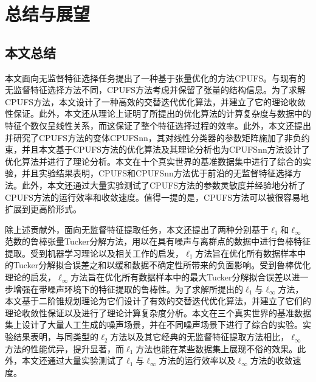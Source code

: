 \chapter{总结与展望}\label{chap:conc}

\section{本文总结}

本文面向无监督特征选择任务提出了一种基于张量优化的方法CPUFS。与现有的无监督特征选择方法不同，CPUFS方法考虑并保留了张量的结构信息。为了求解CPUFS方法，本文设计了一种高效的交替迭代优化算法，并建立了它的理论收敛性保证。此外，本文还从理论上证明了所提出的优化算法的计算复杂度与数据中的特征个数仅呈线性关系，而这保证了整个特征选择过程的效率。此外，本文还提出并研究了CPUFS方法的变体CPUFSnn，其对线性分类器的参数矩阵施加了非负约束，并且本文基于CPUFS方法的优化算法及其理论分析也为CPUFSnn方法设计了优化算法并进行了理论分析。本文在十个真实世界的基准数据集中进行了综合的实验，并且实验结果表明，CPUFS和CPUFSnn方法优于前沿的无监督特征选择方法。此外，本文还通过大量实验测试了CPUFS方法的参数灵敏度并经验地分析了CPUFS方法的运行效率和收敛速度。值得一提的是，CPUFS方法可以被很容易地扩展到更高阶形式。

除上述贡献外，面向无监督特征提取任务，本文还提出了两种分别基于$\ell_{1}$和$\ell_{\infty}$范数的鲁棒张量Tucker分解方法，用以在具有噪声与离群点的数据中进行鲁棒特征提取。受到机器学习理论以及相关工作的启发，$\ell_1$方法旨在优化所有数据样本中的Tucker分解拟合误差之和以缓和数据不确定性所带来的负面影响。受到鲁棒优化理论的启发，$\ell_\infty$方法旨在优化所有数据样本中的最大Tucker分解拟合误差以进一步增强在带噪声环境下的特征提取的鲁棒性。为了求解所提出的$\ell_1$与$\ell_\infty$方法，本文基于二阶锥规划理论为它们设计了有效的交替迭代优化算法，并建立了它们的理论收敛性保证以及进行了理论计算复杂度分析。本文在三个真实世界的基准数据集上设计了大量人工生成的噪声场景，并在不同噪声场景下进行了综合的实验。实验结果表明，与同类型的$\ell_2$方法以及其它经典的无监督特征提取方法相比，$\ell_\infty$方法的性能优异，提升显著，而$\ell_1$方法也能在某些数据集上展现不俗的效果。此外，本文还通过大量实验测试了$\ell_1$与$\ell_\infty$方法的运行效率以及$\ell_\infty$方法的收敛速度。

